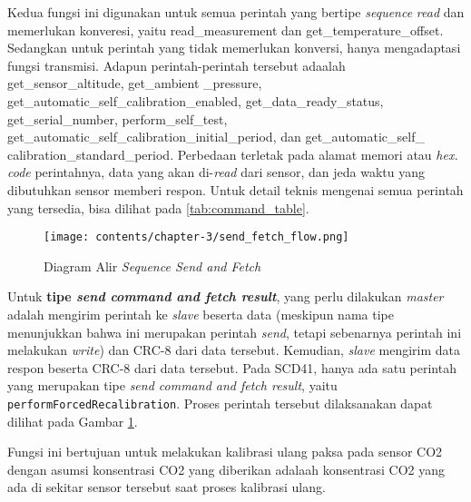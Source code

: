         Kedua fungsi ini digunakan untuk semua perintah yang bertipe \textit{sequence} \textit{read} dan memerlukan konveresi, yaitu read\_measurement dan get\_temperature\_offset. Sedangkan untuk perintah yang tidak memerlukan konversi, hanya mengadaptasi fungsi transmisi. Adapun perintah-perintah tersebut adaalah get\_sensor\_altitude, get\_ambient \_pressure, get\_automatic\_self\_calibration\_enabled, get\_data\_ready\_status, get\_serial\_number, perform\_self\_test, get\_automatic\_self\_calibration\_initial\_period, dan get\_automatic\_self\_ calibration\_standard\_period. Perbedaan terletak pada alamat memori atau \textit{hex. code} perintahnya, data yang akan di-\textit{read} dari sensor, dan jeda waktu yang dibutuhkan sensor memberi respon. Untuk detail teknis mengenai semua perintah yang tersedia, bisa dilihat pada \ref{tab:command_table}.


        \begin{figure}[H]
            \centering
            \texttt{[image: contents/chapter-3/send\_fetch\_flow.png]}
            \caption{Diagram Alir \textit{Sequence Send and Fetch}}
            \label{fig:send_fetch_flow}
        \end{figure}

        Untuk \textbf{tipe \textit{send command and fetch result}}, yang perlu dilakukan \textit{master} adalah mengirim perintah ke \textit{slave} beserta data (meskipun nama tipe menunjukkan bahwa ini merupakan perintah \textit{send}, tetapi sebenarnya perintah ini melakukan \textit{write}) dan CRC-8 dari data tersebut. Kemudian, \textit{slave} mengirim data respon beserta CRC-8 dari data tersebut. Pada SCD41, hanya ada satu perintah yang merupakan tipe \textit{send command and fetch result}, yaitu \texttt{performForcedRecalibration}. Proses perintah tersebut dilaksanakan dapat dilihat pada Gambar \ref{fig:send_fetch_flow}. 

        Fungsi ini bertujuan untuk melakukan kalibrasi ulang paksa pada sensor CO2 dengan asumsi konsentrasi CO2 yang diberikan adalaah konsentrasi CO2 yang ada di sekitar sensor tersebut saat proses kalibrasi ulang. 

